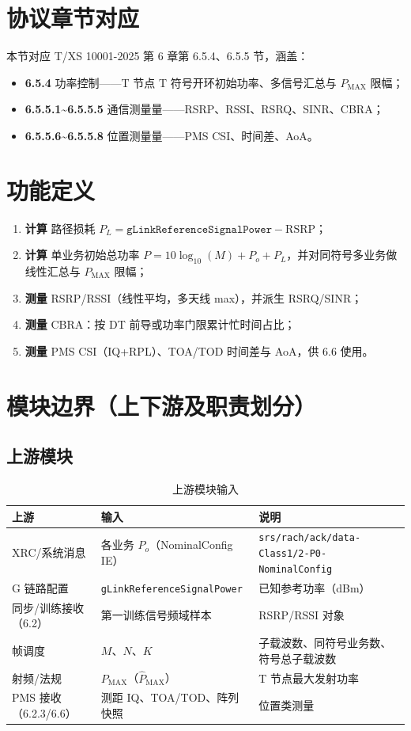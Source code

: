 \documentclass[11pt,a4paper]{ctexart}
\begin{document}
\section{协议章节对应}

本节对应 T/XS 10001-2025 第 6 章第 6.5.4、6.5.5 节，涵盖：
\begin{itemize}[nosep]
  \item \textbf{6.5.4} 功率控制——T 节点 T 符号开环初始功率、多信号汇总与 $P_{\mathrm{MAX}}$ 限幅；
  \item \textbf{6.5.5.1\textasciitilde 6.5.5.5} 通信测量量——RSRP、RSSI、RSRQ、SINR、CBRA；
  \item \textbf{6.5.5.6\textasciitilde 6.5.5.8} 位置测量量——PMS CSI、时间差、AoA。
\end{itemize}

\section{功能定义}

\begin{enumerate}[nosep]
  \item \textbf{计算} 路径损耗 $P_L=\texttt{gLinkReferenceSignalPower}-\mathrm{RSRP}$；
  \item \textbf{计算} 单业务初始总功率 $P=10\log_{10}(M)+P_o+P_L$，并对同符号多业务做线性汇总与 $P_{\mathrm{MAX}}$ 限幅；
  \item \textbf{测量} RSRP/RSSI（线性平均，多天线 max），并派生 RSRQ/SINR；
  \item \textbf{测量} CBRA：按 DT 前导或功率门限累计忙时间占比；
  \item \textbf{测量} PMS CSI（IQ+RPL）、TOA/TOD 时间差与 AoA，供 6.6 使用。
\end{enumerate}

\section{模块边界（上下游及职责划分）}

\subsection{上游模块}

\begin{longtable}{L{4.2cm}L{4.5cm}L{5.5cm}}
\caption{上游模块输入\label{tab:6545-up}} \\
\toprule
\textbf{上游} & \textbf{输入} & \textbf{说明} \\
\midrule
XRC/系统消息 & 各业务 $P_o$（NominalConfig IE） & \texttt{srs/rach/ack/data-Class1/2-P0-NominalConfig} \\
G 链路配置 & \texttt{gLinkReferenceSignalPower} & 已知参考功率（dBm） \\
同步/训练接收（6.2） & 第一训练信号频域样本 & RSRP/RSSI 对象 \\
帧调度 & $M$、$N$、$K$ & 子载波数、同符号业务数、符号总子载波数 \\
射频/法规 & $P_{\mathrm{MAX}}$（$\hat{P}_{\mathrm{MAX}}$） & T 节点最大发射功率 \\
PMS 接收（6.2.3/6.6） & 测距 IQ、TOA/TOD、阵列快照 & 位置类测量 \\
\bottomrule
\end{longtable}
\end{document}

